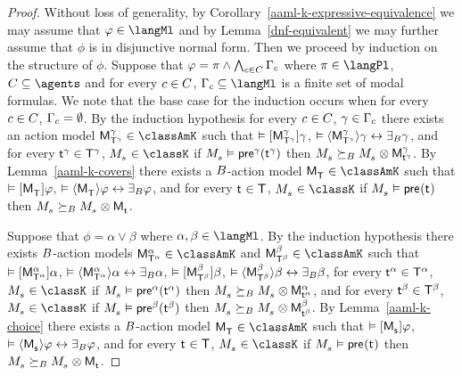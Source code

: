\begin{proof}
Without loss of generality, by Corollary~\ref{aaml-k-expressive-equivalence} we may assume that $\phi \in \langMl$ and by Lemma~\ref{dnf-equivalent} we may further assume that $\phi$ is in disjunctive normal form.
Then we proceed by induction on the structure of $\phi$.  
Suppose that $\phi = \pi \land \bigwedge_{\agentC \in \agentsC} \Gamma_\agentC$ where $\pi \in \langPl$, $\agentsC \subseteq \agents$ and for every $\agentC \in \agentsC$, $\Gamma_\agentC \subseteq \langMl$ is a finite set of modal formulas.
We note that the base case for the induction occurs when for every $\agentC \in \agentsC$, $\Gamma_\agentC = \emptyset$.
By the induction hypothesis for every $\agentC \in \agentsC$, $\gamma \in \Gamma_\agentC$ there exists 
an action model $\aPModel[\gamma]{\aStatesT[\gamma]} \in \classAmK$ such that
$\entails \actionA{\aPModel[\gamma]{\aStatesT[\gamma]}} \gamma$,
$\entails \actionE{\aPModel[\gamma]{\aStatesT[\gamma]}} \gamma \iff \someactsBs \gamma$, and
for every $\aStateT[\gamma] \in \aStatesT[\gamma]$, $\kPModel{\kStateS} \in \classK$ if $\kPModel{\kStateS} \entails \aPrecondition[\gamma](\aStateT[\gamma])$ then $\kPModel{\kStateS} \simulatesBs \kPModel{\kStateS} \exec \aPModel[\gamma]{\aStateT[\gamma]}$.
By Lemma~\ref{aaml-k-covers} there exists a $\agentsB$-action model $\aPModel{\aStatesT} \in \classAmK$ such that 
$\entails \actionA{\aPModel{\aStatesT}} \phi$,
$\entails \actionE{\aPModel{\aStatesT}} \phi \iff \someactsBs \phi$, and
for every $\aStateT \in \aStatesT$, $\kPModel{\kStateS} \in \classK$ if $\kPModel{\kStateS} \entails \aPrecondition(\aStateT)$ then $\kPModel{\kStateS} \simulatesBs \kPModel{\kStateS} \exec \aPModel{\aStateT}$.

Suppose that $\phi = \alpha \lor \beta$ where $\alpha, \beta \in \langMl$.
By the induction hypothesis there exists $\agentsB$-action models
$\aPModel[\alpha]{\aStatesT[\alpha]} \in \classAmK$ and $\aPModel[\beta]{\aStatesT[\beta]} \in \classAmK$ such that 
$\entails \actionA{\aPModel[\alpha]{\aStatesT[\alpha]}} \alpha$, 
$\entails \actionE{\aPModel[\alpha]{\aStatesT[\alpha]}} \alpha \iff \someactsBs \alpha$, 
$\entails \actionA{\aPModel[\beta]{\aStatesT[\beta]}} \beta$,
$\entails \actionE{\aPModel[\beta]{\aStatesT[\beta]}} \beta \iff \someactsBs \beta$,
for every $\aStateT[\alpha] \in \aStatesT[\alpha]$, $\kPModel{\kStateS} \in \classK$ if $\kPModel{\kStateS} \entails \aPrecondition[\alpha](\aStateT[\alpha])$ then $\kPModel{\kStateS} \simulatesBs \kPModel{\kStateS} \exec \aPModel[\alpha]{\aStateT[\alpha]}$, and
for every $\aStateT[\beta] \in \aStatesT[\beta]$, $\kPModel{\kStateS} \in \classK$ if $\kPModel{\kStateS} \entails \aPrecondition[\beta](\aStateT[\beta])$ then $\kPModel{\kStateS} \simulatesBs \kPModel{\kStateS} \exec \aPModel[\beta]{\aStateT[\beta]}$.
By Lemma~\ref{aaml-k-choice} there exists a $\agentsB$-action model $\aPModel{\aStatesT} \in \classAmK$ such that 
$\entails \actionA{\aPModel{\aStateS}} \phi$,
$\entails \actionE{\aPModel{\aStateS}} \phi \iff \someactsBs \phi$, and
for every $\aStateT \in \aStatesT$, $\kPModel{\kStateS} \in \classK$ if $\kPModel{\kStateS} \entails \aPrecondition(\aStateT)$ then $\kPModel{\kStateS} \simulatesBs \kPModel{\kStateS} \exec \aPModel{\aStateT}$.
\end{proof}

